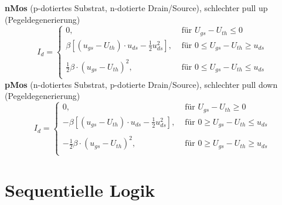 \documentclass[english]{latex4ei/latex4ei_sheet}
\begin{document}
\textbf{nMos} (p-dotiertes Substrat, n-dotierte Drain/Source), schlechter pull up (Pegeldegenerierung)
\begin{equation*}
    \!\!\! I_d = \begin{cases}
        0,                                                              & \text{ für }  U_{gs} - U_{th} \le 0            \\[0.2em]
        \beta [(u_{gs} - U_{th}) \cdot u_{ds} - \frac{1}{2} u_{ds}^2] , & \text{ für }  0 \le U_{gs} - U_{th} \ge u_{ds} \\\\[0.2em]
        \frac{1}{2} \beta \cdot (u_{gs} - U_{th})^2,                    & \text{ für }  0 \le U_{gs} - U_{th} \le u_{ds} \\
    \end{cases}
\end{equation*}
\textbf{pMos} (n-dotiertes Substrat, p-dotierte Drain/Source), schlechter pull down (Pegeldegenerierung)
\begin{equation*}
    \!\!\! I_d = \begin{cases}
        0,                                                                & \text{ für }  U_{gs} - U_{th} \ge 0            \\[0.2em]
        - \beta [(u_{gs} - U_{th}) \cdot u_{ds} - \frac{1}{2} u_{ds}^2] , & \text{ für }  0 \ge U_{gs} - U_{th} \le u_{ds} \\\\[0.2em]
        - \frac{1}{2} \beta \cdot (u_{gs} - U_{th})^2,                    & \text{ für }  0 \ge U_{gs} - U_{th} \ge u_{ds} \\
    \end{cases}
\end{equation*}

\section{Sequentielle Logik}
\end{document}
